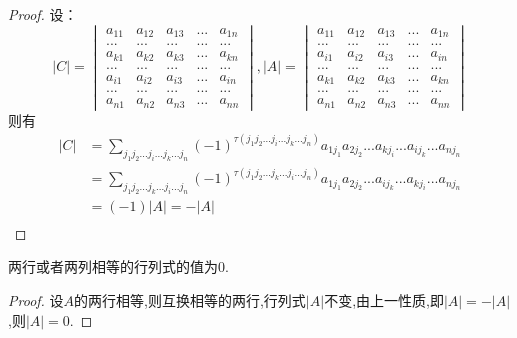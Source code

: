 \documentclass[blue,normal,cn]{elegantnote}
\begin{document}
\begin{proof}
    设：
    \begin{equation*}
        |C|=   \begin{vmatrix} 
            a_{11}&a_{12} & a_{13} &...& a_{1n}\\
            ...&...&...&...&...\\
            a_{k1}&a_{k2} & a_{k3} &...& a_{kn}\\
            ...&...&...&...&...\\
            a_{i1}&a_{i2} & a_{i3} &...& a_{in}\\
            ...&...&...&...&...\\
            a_{n1}&a_{n2} & a_{n3} &...& a_{nn}
            \end{vmatrix}
            ,
        |A|=\begin{vmatrix} 
            a_{11}&a_{12} & a_{13} &...& a_{1n}\\
            ...&...&...&...&...\\
            a_{i1}&a_{i2} & a_{i3} &...& a_{in}\\
            ...&...&...&...&...\\
            a_{k1}&a_{k2} & a_{k3} &...& a_{kn}\\
            ...&...&...&...&...\\
            a_{n1}&a_{n2} & a_{n3} &...& a_{nn}
            \end{vmatrix}
    \end{equation*}
则有
    \begin{equation*}
        \begin{aligned}
            |C|&=  \sum_{j_1j_2...j_i...j_k...j_n}(-1)^{\tau(j_1 j_2...j_i...j_k...j_n)}a_{1 j_1}a_{2 j_2}...a_{k j_i}...a_{i j_k}...a_{n j_n}\\
               &= \sum_{j_1j_2...j_k...j_i...j_n}(-1)^{\tau(j_1 j_2...j_k...j_i...j_n)}a_{1 j_1}a_{2 j_2}...a_{i j_k}...a_{k j_i}...a_{n j_n}\\
                &=(-1)|A|=-|A|\\
            \end{aligned}
    \end{equation*}
\end{proof}


\begin{property}
    两行或者两列相等的行列式的值为0.
\end{property}

\begin{proof}
设$A$的两行相等,则互换相等的两行,行列式$|A|$不变,由上一性质,即$|A|=-|A|$,则$|A|=0$.
\end{proof}
\end{document}
